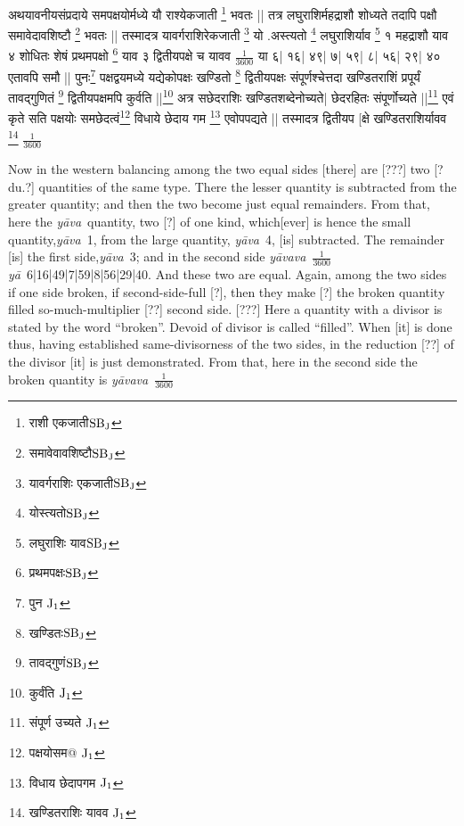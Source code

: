 \documentclass[11pt,a5paper]{book}
\def\ya{\textit{y\=a}}
\def\yava{\textit{y\=ava}}
\def\yavava{\textit{y\=avava}}
\begin{document}
\newpage
{\s अथयावनीयसंप्रदाये समपक्षयोर्मध्ये यौ
राश्येकजाती \footnote{{\s राशी एकजाती}${\rm SB_J}$} भवतः ||
तत्र लघुराशिर्महद्राशौ शोध्यते तदापि पक्षौ समावेदावशिष्टौ \footnote{{\s समावेवावशिष्टौ}${\rm SB_J}$}
भवतः ||
तस्मादत्र यावर्गराशिरेकजाती \footnote{{\s यावर्गराशिः एकजाती}${\rm SB_J}$} यो .अस्त्यतो \footnote{{\s योस्त्यतो}${\rm SB_J}$} लघुराशिर्याव \footnote{{\s लघुराशिः याव}${\rm SB_J}$} १
महद्राशौ याव ४ शोधितः शेषं प्रथमपक्षो \footnote{{\s प्रथमपक्षः}${\rm SB_J}$} याव ३
द्वितीयपक्षे च यावव $\frac{1}{3600}$
या ६| १६| ४९| ७| ५९| ८| ५६| २९| ४०
एतावपि समौ ||
पुनः\footnote{{\s पुन } ${\rm J_1}$}
पक्षद्वयमध्ये यद्येकोपक्षः खण्डितो \footnote{{\s खण्डितः}${\rm SB_J}$} द्वितीयपक्षः
संपूर्णश्चेत्तदा खण्डितराशिं प्रपूर्यं
तावद्गुणितं \footnote{{\s तावद्गुणं}${\rm SB_J}$} द्वितीयपक्षमपि
कुर्वति ||\footnote{{\s कुर्वंति }${\rm J_1}$}
अत्र सछेदराशिः खण्डितशब्देनोच्यते|
छेदरहितः संपूर्णोच्यते ||\footnote{{\s संपूर्ण उच्यते }${\rm J_1}$}
एवं कृते सति पक्षयोः समछेदत्वं\footnote{{\s पक्षयोसम@ }${\rm J_1}$}
विधाये छेदाय गम \footnote{{\s विधाय छेदापगम }${\rm J_1}$}
 एवोपपद्यते ||
तस्मादत्र द्वितीयप [क्षे 
खण्डितराशिर्यावव \footnote{{\s खण्डितराशिः यावव }${\rm J_1}$} $\frac{1}{3600}$}

\newpage
Now in the western balancing among the two equal sides [there] are [???] two [? du.?] quantities
of the same type. There the lesser quantity is subtracted from the greater quantity; and then the two
become just equal remainders. From that, here the \yava\ quantity, two [?] of one kind,
which[ever] is hence the small quantity,\yava\ 1, from the large quantity, \yava\
4, [is] subtracted. The remainder [is] the first side,\yava\ 3; and in the second side \yavava\  $\frac{1}{3600}$  \ya\ 6|16|49|7|59|8|56|29|40. 
And these two are equal. Again, among the two sides if one side broken, if second-side-full [?], then they make [?] the broken quantity filled
so-much-multiplier [??] second side. [???] Here a quantity with a divisor is stated by the word
“broken”. Devoid of divisor is called “filled”. When [it] is done thus, having established same-divisorness of the two sides, in the reduction [??] of the divisor [it] is just demonstrated. From that, here in the second side  
the broken quantity is \yavava\ $\frac{1}{3600}$
\end{document}
